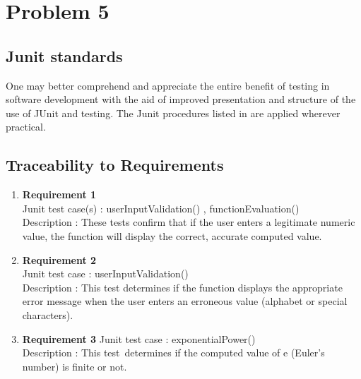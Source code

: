 \documentclass[
	12pt
]{article}
\begin{document}
\section{Problem 5}
\subsection{Junit standards}
 One may better comprehend and appreciate the entire benefit of testing in software development with the aid of improved presentation and structure of the use of JUnit and testing. The Junit procedures listed in are applied wherever practical.
\subsection{Traceability to Requirements}
\begin{enumerate}
    \item \textbf{Requirement 1}\\
    Junit test case(s) : userInputValidation() , functionEvaluation() \\
    Description : These tests confirm that if the user enters a legitimate numeric value, the function will display the correct, accurate computed value.
    \item
    \textbf{Requirement 2} \\
    Junit test case : userInputValidation() \\
    Description : This test determines if the function displays the appropriate error message when the user enters an erroneous value (alphabet or special characters).
    \item
   \textbf{Requirement 3} \newline
    Junit test case : exponentialPower() \\
    Description : This test determines if the computed value of e (Euler's number) is finite or not.
\end{enumerate}
\end{document}
